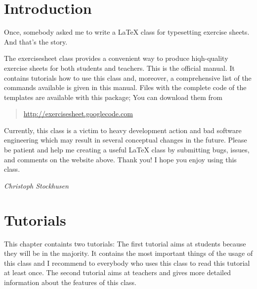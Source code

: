 \documentclass[a4paper,fleqn]{report}
\let\sffamily=\rmfamily
\def\exercisesheet{{exercisesheet}}
\begin{document}



\chapter*{Introduction}

Once, somebody asked me to write a \LaTeX{} class for typesetting
exercise sheets. And that's the story.

\medskip

\noindent The \exercisesheet{} class provides a convenient way to
produce hiqh-quality exercise sheets for both students and teachers.
This is the official manual. It contains tutorials how to use this
class and, moreover, a comprehensive list of the commands available is
given in this manual. Files with the complete code of the templates
are available with this package; You can download them from 
\begin{quote}
  \url{http://exercisesheet.googlecode.com} 
\end{quote}
Currently, this class is a victim to heavy development action and bad
software engineering which may result in several conceptual changes in
the future. Please be patient and help me creating a useful \LaTeX{}
class by submitting bugs, issues, and comments on the website above.
Thank you! I hope you enjoy using this class.

\medskip\hfill{\itshape Christoph Stockhusen}

\tableofcontents

\chapter{Tutorials}

This chapter containts two tutorials: The first tutorial aims at
students because they will be in the majority. It contains the most
important things of the usage of this class and I recommend to
everybody who uses this class to read this tutorial at least once. The
second tutorial aims at teachers and gives more detailed information
about the features of this class.
\end{document}
